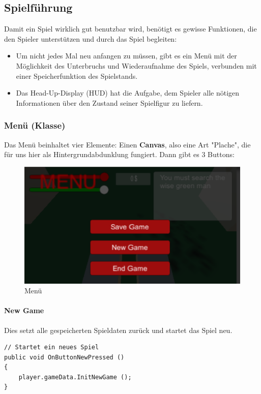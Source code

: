 \subsection{Spielführung}
Damit ein Spiel wirklich gut benutzbar wird, benötigt es gewisse Funktionen, die den Spieler unterstützen und durch das Spiel begleiten:
\begin{itemize}
\item Um nicht jedes Mal neu anfangen zu müssen, gibt es ein Menü mit der Möglichkeit des Unterbruchs und Wiederaufnahme des Spiels, verbunden mit einer Speicherfunktion des Spielstands.
\item Das Head-Up-Display (HUD) hat die Aufgabe, dem Spieler alle nötigen Informationen über den Zustand seiner Spielfigur zu liefern.
\end{itemize}

\subsubsection{Menü (Klasse)}
Das Menü beinhaltet vier Elemente: Einen \textbf{Canvas}, also eine Art "Plache", die für uns hier als Hintergrundabdunklung fungiert. Dann gibt es 3 Buttons:

\begin{figure}[H]
\includegraphics[scale=1]{screenshots/menuscreen.png}
\caption{Menü}
\end{figure}


\paragraph{New Game}
Dies setzt alle gespeicherten Spieldaten zurück und startet das Spiel neu.

\begin{lstlisting}[caption={New Game}]
// Startet ein neues Spiel
public void OnButtonNewPressed ()
{
	player.gameData.InitNewGame ();
}

\end{lstlisting}

